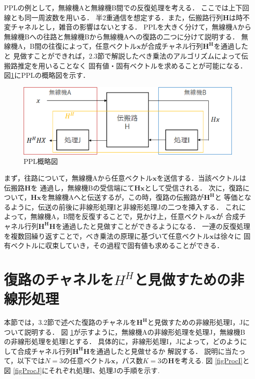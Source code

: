 PPLの例として，無線機Aと無線機B間での反復処理を考える．
ここでは上下回線とも同一周波数を用いる．
半2重通信を想定する．また，伝搬路行列$\bm{H}$は時不変チャネルとし，雑音の影響はないとする．
PPLを大きく分けて，無線機Aから無線機Bへの往路と無線機Bから無線機Aへの復路の二つに分けて説明する．
無線機A，B間の往復によって，任意ベクトル$\bm{x}$が合成チャネル行列$\bm{H^H}$を通過したと
見做すことができれば，2.3節で解説したべき乗法のアルゴリズムによって伝搬路推定を用いることなく
固有値・固有ベクトルを求めることが可能になる．
図\ref{figPPL}にPPLの概略図を示す．

\begin{figure}
    \centering
    \includegraphics[width=\linewidth]{chapter3/figure/PPL.eps}
    \caption{PPL概略図}
    \label{figPPL}
\end{figure}

まず，往路について，無線機Aから任意ベクトル$\bm{x}$を送信する．当該ベクトルは伝搬路$\bm{H}$を
通過し，無線機Bの受信端にて$\bm{Hx}$として受信される．
次に，復路について，$\bm{Hx}$を無線機Aへと伝送するが，この時，復路の伝搬路が$\bm{H^H}$と
等価となるように，伝送の前後に非線形処理Iと非線形処理Jの二つを挿入する．
これによって，無線機A，B間を反復することで，見かけ上，任意ベクトル$\bm{x}$が
合成チャネル行列$\bm{H^HH}$を通過したと見做すことができるようになる．
一連の反復処理を複数回繰り返すことで，べき乗法の原理に基づいて任意ベクトル$\bm{x}$は徐々に
固有ベクトルに収束していき，その過程で固有値も求めることができる．

\section{復路のチャネルを$H^H$と見做すための非線形処理}
本節では，3.2節で述べた復路のチャネルを$\bm{H^H}$と見做すための非線形処理I，Jについて説明する．
図 \ref{figPPL}が示すように，無線機Aの非線形処理を処理J，無線機Bの非線形処理を処理Iとする．
具体的に，非線形処理I，Jによって，どのようにして合成チャネル行列$\bm{H^HH}$を通過したと見做せるか
解説する．
説明に当たって，以下では$N=3$の任意ベクトル$\bm{x}$，パス数$K=3$の$\bm{H}$を考える.
図 \ref{figProcI}と図 \ref{figProcJ}にそれぞれ処理I、処理Jの手順を示す.

